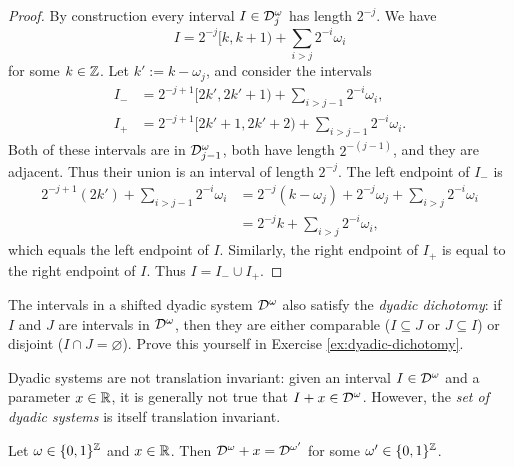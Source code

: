 \begin{proof}
  By construction every interval $I \in \mathcal{D}_{j}^{\omega}$ has length $2^{-j}$.
  We have
  \begin{equation*}
    I = 2^{-j}[k,k+1) + \sum_{i > j} 2^{-i} \omega_{i}
  \end{equation*}
  for some $k \in \mathbb{Z}$.
  Let $k' := k - \omega_{j}$, and consider the intervals
  \begin{equation*}
    \begin{aligned}
      I_{-} &= 2^{-{j+1}}[2k', 2k'+1) + \sum_{i > j-1} 2^{-i} \omega_{i}, \\
      I_{+} &= 2^{-{j+1}}[2k'+1, 2k'+2) + \sum_{i > j-1} 2^{-i} \omega_{i}. 
    \end{aligned}
  \end{equation*}
  Both of these intervals are in $\mathcal{D}^{\omega}_{j-1}$, both have length $2^{-(j-1)}$, and they are adjacent.
  Thus their union is an interval of length $2^{-j}$.
  The left endpoint of $I_{-}$ is
  \begin{equation*}
    \begin{aligned}
    2^{-j+1}(2k') + \sum_{i > j-1} 2^{-i} \omega_{i}
    &= 2^{-j}(k - \omega_{j}) + 2^{-j} \omega_{j} + \sum_{i > j} 2^{-i} \omega_{i} \\
    &= 2^{-j}k + \sum_{i > j} 2^{-i} \omega_{i},
  \end{aligned}
  \end{equation*}
  which equals the left endpoint of $I$.
  Similarly, the right endpoint of $I_{+}$ is equal to the right endpoint of $I$.
  Thus $I = I_{-} \cup I_{+}$.
\end{proof}

\begin{rmk}\label{rmk:dyadic-dichotomy}
The intervals in a shifted dyadic system $\mathcal{D}^{\omega}$ also satisfy the \emph{dyadic dichotomy}: if $I$ and $J$ are intervals in $\mathcal{D}^{\omega}$, then they are either comparable ($I \subseteq J$ or $J \subseteq I$) or disjoint ($I \cap J = \varnothing$).
Prove this yourself in Exercise \ref{ex:dyadic-dichotomy}.
\end{rmk}

Dyadic systems are not translation invariant: given an interval $I \in \mathcal{D}^{\omega}$ and a parameter $x \in \mathbb{R}$, it is generally not true that $I + x \in \mathcal{D}^{\omega}$.
However, the \emph{set of dyadic systems} is itself translation invariant.

\begin{prop}
  Let $\omega \in \{0,1\}^{\mathbb{Z}}$ and $x \in \mathbb{R}$.
  Then $\mathcal{D}^{\omega} + x = \mathcal{D}^{\omega'}$ for some $\omega' \in \{0,1\}^{\mathbb{Z}}$.
\end{prop}

